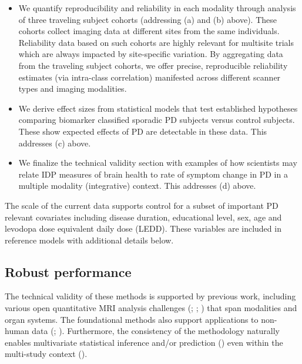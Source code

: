 \documentclass[
  table]{article}
\begin{document}
\begin{itemize}
\item
  We quantify reproducibility and reliability in each modality through
  analysis of three traveling subject cohorts (addressing (a) and (b)
  above). These cohorts collect imaging data at different sites from the
  same individuals. Reliability data based on such cohorts are highly
  relevant for multisite trials which are always impacted by
  site-specific variation. By aggregating data from the traveling
  subject cohorts, we offer precise, reproducible reliability estimates
  (via intra-class correlation) manifested across different scanner
  types and imaging modalities.
\item
  We derive effect sizes from statistical models that test established
  hypotheses comparing biomarker classified sporadic PD subjects versus
  control subjects. These show expected effects of PD are detectable in
  these data. This addresses (c) above.
\item
  We finalize the technical validity section with examples of how
  scientists may relate IDP measures of brain health to rate of symptom
  change in PD in a multiple modality (integrative) context. This
  addresses (d) above.
\end{itemize}

The scale of the current data supports control for a subset of important
PD relevant covariates including disease duration, educational level,
sex, age and levodopa dose equivalent daily dose (LEDD). These variables
are included in reference models with additional details below.

\subsection{Robust performance}\label{robust-performance}

The technical validity of these methods is supported by previous work,
including various open quantitative MRI analysis challenges
(;
;
) that span
modalities and organ systems. The foundational methods also support
applications to non-human data
(;
).
Furthermore, the consistency of the methodology naturally enables
multivariate statistical inference and/or prediction
() even within
the multi-study context ().
\end{document}
